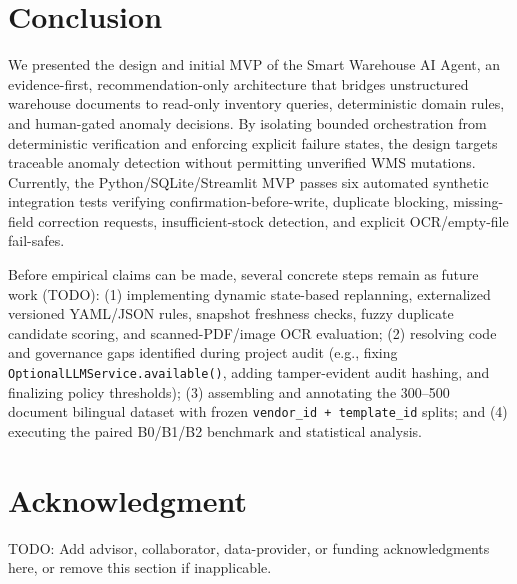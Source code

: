 \documentclass[conference]{IEEEtran}
\begin{document}
\section{Conclusion}

We presented the design and initial MVP of the Smart Warehouse AI Agent, an evidence-first, recommendation-only architecture that bridges unstructured warehouse documents to read-only inventory queries, deterministic domain rules, and human-gated anomaly decisions. By isolating bounded orchestration from deterministic verification and enforcing explicit failure states, the design targets traceable anomaly detection without permitting unverified WMS mutations. Currently, the Python/SQLite/Streamlit MVP passes six automated synthetic integration tests verifying confirmation-before-write, duplicate blocking, missing-field correction requests, insufficient-stock detection, and explicit OCR/empty-file fail-safes.

Before empirical claims can be made, several concrete steps remain as future work (TODO): (1) implementing dynamic state-based replanning, externalized versioned YAML/JSON rules, snapshot freshness checks, fuzzy duplicate candidate scoring, and scanned-PDF/image OCR evaluation; (2) resolving code and governance gaps identified during project audit (e.g., fixing \texttt{OptionalLLMService.\allowbreak available()}, adding tamper-evident audit hashing, and finalizing policy thresholds); (3) assembling and annotating the 300--500 document bilingual dataset with frozen \texttt{vendor\_\allowbreak id + template\_\allowbreak id} splits; and (4) executing the paired B0/B1/B2 benchmark and statistical analysis.

\section*{Acknowledgment}

TODO: Add advisor, collaborator, data-provider, or funding acknowledgments here, or remove this section if inapplicable.
\end{document}
